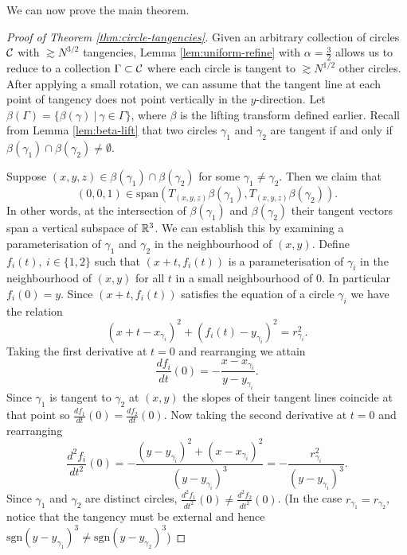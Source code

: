 We can now prove the main theorem. 
\begin{proof}[Proof of Theorem \ref{thm:circle-tangencies}]
    Given an arbitrary collection of circles $\mathcal C$ with $\gtrsim N^{3/2}$ tangencies, Lemma \ref{lem:uniform-refine} with $\alpha = \frac{3}{2}$ 
    allows us to reduce to a collection
     $\Gamma \subset \mathcal C$ where each circle is tangent to  $\gtrsim N^{1/2}$ other circles. 
    After applying a small rotation, we can assume that the tangent line at each point of tangency does not point vertically in the $y$-direction.
    Let $\beta (\Gamma) = \{ \beta(\gamma) \ | \ \gamma \in \Gamma \}$, where $\beta$ is the lifting transform defined earlier.
    Recall from Lemma \ref{lem:beta-lift} that two circles $\gamma_1$ and $\gamma_2$ are tangent if and only if $\beta(\gamma_1) \cap \beta(\gamma_2) \neq \emptyset$.

    Suppose $(x,y,z) \in \beta(\gamma_1) \cap \beta(\gamma_2) $ for some $\gamma_1 \neq \gamma_2$. 
    Then we claim that $$(0,0,1) \in \text{span} \left( T_{(x,y,z) }\beta (\gamma_1), T_{(x,y,z) }\beta (\gamma_2)\right).$$
    In other words, at the intersection of $\beta(\gamma_1)$ and $\beta(\gamma_2)$ their tangent vectors span a vertical subspace of $\mathbb R^3$. 
    We can establish this by examining a parameterisation of $\gamma_1$ and $\gamma_2$ in the neighbourhood of $(x,y)$.
    Define $f_i (t), \ i \in \{1,2\}$ such that $(x+t, f_i(t))$ is a parameterisation of $\gamma_i$ in the neighbourhood of $(x,y)$ for all $t$ in a small neighbourhood of 0. In particular $f_i(0) = y$. Since $(x+t, f_i(t))$ satisfies the equation of a circle $\gamma_i$ we have the relation 
    \[
        (x+t - x_{\gamma_i})^2 +  (f_i(t) - y_{\gamma_i})^2 = r_{\gamma_i}^2.
    \]
    Taking the first derivative at $t=0$ and rearranging we attain
    \[
        \frac{df_i}{dt}(0) = -\frac{x- x_{\gamma_i}}{y- y_{\gamma_i}}.
    \]
    Since $\gamma_1$ is tangent to $\gamma_2$ at $(x,y)$ the slopes of their tangent lines coincide at that point so $\frac{df_1}{dt}(0) = \frac{df_2}{dt}(0)$. Now taking the second derivative at $t=0$ and rearranging
    \[
        \frac{d^2f_i}{dt^2}(0) = -\frac{(y- y_{\gamma_i})^2 + (x- x_{\gamma_i})^2}{(y- y_{\gamma_i})^3} = -\frac{r^2_{\gamma_i}}{(y- y_{\gamma_i})^3} .
    \]
    Since $\gamma_1$ and $\gamma_2$ are distinct circles, $\frac{d^2f_1}{dt^2}(0) \neq \frac{d^2f_2}{dt^2}(0)$. (In the case $r_{\gamma_1} = r_{\gamma_2}$, notice that the tangency must be external and hence $\text{sgn}(y-y_{\gamma_1})^3\neq \text{sgn}(y-y_{\gamma_2})^3$)




\end{proof}
